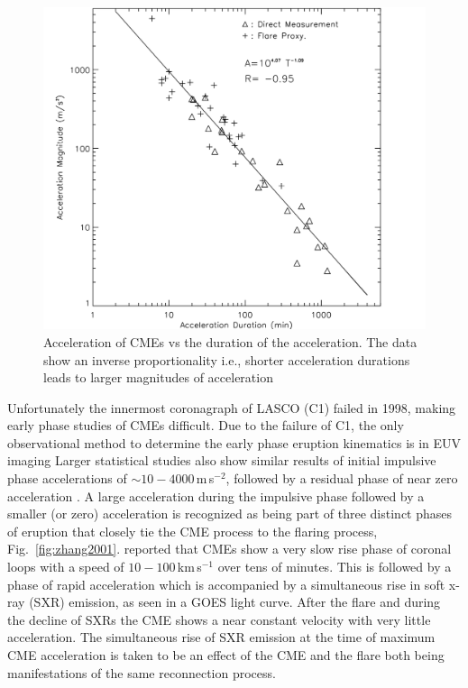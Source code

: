 \begin{figure}[t!]
\begin{center}
\includegraphics[scale=0.25]{images/accel_zhang2006}
\caption[CME acceleration as a function of acceleration duration]{Acceleration of CMEs vs the duration of the acceleration. The data show an inverse proportionality i.e., shorter acceleration durations leads to larger magnitudes of acceleration \citep{zhang2006}}
\label{fig:acell_duration}
\end{center}
\end{figure}
Unfortunately the innermost coronagraph of LASCO (C1) failed in 1998, making early phase studies of CMEs difficult. Due to the failure of C1, the only observational method to determine the early phase eruption kinematics is in EUV imaging
Larger statistical studies also show similar results of initial impulsive phase accelerations of $\sim10-4000$\,m\,s$^{-2}$, followed by a residual phase of near zero acceleration \citep{vrsnak2007, temmer2010}. A large acceleration during the impulsive phase followed by a smaller (or zero) acceleration is recognized as being part of three distinct phases of eruption that closely tie the CME process to the flaring process, Fig.~\ref{fig:zhang2001}. \citet{zhang2001, zhang2004} reported that CMEs show a very slow rise phase of coronal loops with a speed of $10-100$\,km\,s$^{-1}$ over tens of minutes. This is followed by a phase of rapid acceleration which is accompanied by a simultaneous rise in soft x-ray (SXR) emission, as seen in a GOES light curve. After the flare and during the decline of SXRs the CME shows a near constant velocity with very little acceleration. The simultaneous rise of SXR emission at the time of maximum CME acceleration is taken to be an effect of the CME and the flare both being manifestations of the same reconnection process.

